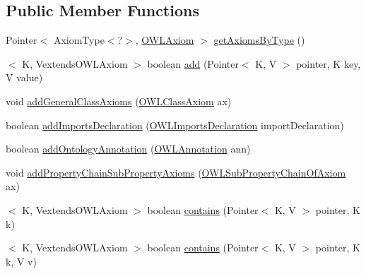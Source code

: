 \subsection*{Public Member Functions}
\begin{DoxyCompactItemize}
\item 
Pointer$<$ Axiom\-Type$<$?$>$, \hyperlink{interfaceorg_1_1semanticweb_1_1owlapi_1_1model_1_1_o_w_l_axiom}{O\-W\-L\-Axiom} $>$ \hyperlink{interfaceuk_1_1ac_1_1manchester_1_1cs_1_1owl_1_1owlapi_1_1_internals_a0ce9f2ac8b46af987d9ab4e291e92658}{get\-Axioms\-By\-Type} ()
\item 
$<$ K, Vextends\-O\-W\-L\-Axiom $>$ boolean \hyperlink{interfaceuk_1_1ac_1_1manchester_1_1cs_1_1owl_1_1owlapi_1_1_internals_af53d9cc1a5d14451464e68c94fb54e5e}{add} (Pointer$<$ K, V $>$ pointer, K key, V value)
\item 
void \hyperlink{interfaceuk_1_1ac_1_1manchester_1_1cs_1_1owl_1_1owlapi_1_1_internals_aa2678839adf7ccff2f1778d9ff176183}{add\-General\-Class\-Axioms} (\hyperlink{interfaceorg_1_1semanticweb_1_1owlapi_1_1model_1_1_o_w_l_class_axiom}{O\-W\-L\-Class\-Axiom} ax)
\item 
boolean \hyperlink{interfaceuk_1_1ac_1_1manchester_1_1cs_1_1owl_1_1owlapi_1_1_internals_a69030686c64f75f318d38988913945dc}{add\-Imports\-Declaration} (\hyperlink{interfaceorg_1_1semanticweb_1_1owlapi_1_1model_1_1_o_w_l_imports_declaration}{O\-W\-L\-Imports\-Declaration} import\-Declaration)
\item 
boolean \hyperlink{interfaceuk_1_1ac_1_1manchester_1_1cs_1_1owl_1_1owlapi_1_1_internals_ac7210d7205932d5da117d898121030dc}{add\-Ontology\-Annotation} (\hyperlink{interfaceorg_1_1semanticweb_1_1owlapi_1_1model_1_1_o_w_l_annotation}{O\-W\-L\-Annotation} ann)
\item 
void \hyperlink{interfaceuk_1_1ac_1_1manchester_1_1cs_1_1owl_1_1owlapi_1_1_internals_a1dcd7697f6a212f049ed86f0fab0eddc}{add\-Property\-Chain\-Sub\-Property\-Axioms} (\hyperlink{interfaceorg_1_1semanticweb_1_1owlapi_1_1model_1_1_o_w_l_sub_property_chain_of_axiom}{O\-W\-L\-Sub\-Property\-Chain\-Of\-Axiom} ax)
\item 
$<$ K, Vextends\-O\-W\-L\-Axiom $>$ boolean \hyperlink{interfaceuk_1_1ac_1_1manchester_1_1cs_1_1owl_1_1owlapi_1_1_internals_ab3f2beb6e7048753348f1fb026521a1f}{contains} (Pointer$<$ K, V $>$ pointer, K k)
\item 
$<$ K, Vextends\-O\-W\-L\-Axiom $>$ boolean \hyperlink{interfaceuk_1_1ac_1_1manchester_1_1cs_1_1owl_1_1owlapi_1_1_internals_ac3e7d7d9a230d7b069732ededf274b99}{contains} (Pointer$<$ K, V $>$ pointer, K k, V v)

\end{DoxyCompactItemize}
